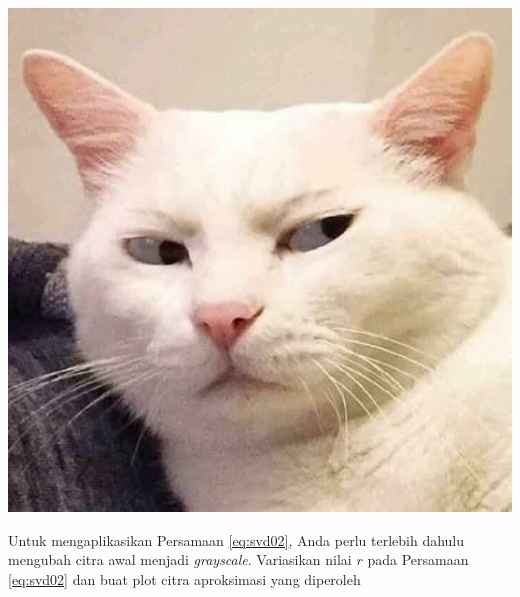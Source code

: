 \documentclass[a4paper,11pt]{article} %
\begin{document}
\begin{enumerate}
{\centering
\includegraphics[scale=0.5]{images/kucing01.png}
\par}

Untuk mengaplikasikan Persamaan \eqref{eq:svd02}, Anda perlu terlebih dahulu
mengubah citra awal menjadi \textit{grayscale}.
Variasikan nilai $r$ pada Persamaan \eqref{eq:svd02} dan buat plot citra aproksimasi
yang diperoleh
\end{enumerate}
\end{document}
